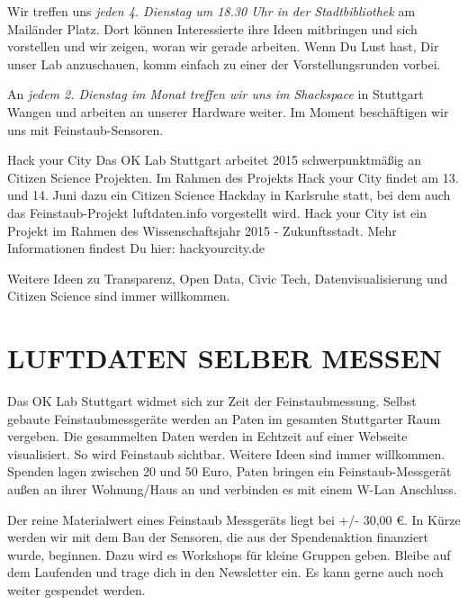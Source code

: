 \documentclass[
notumble,
]{leaflet}
\begin{document}
Wir treffen uns \textit{jeden 4. Dienstag um 18.30 Uhr in der Stadtbibliothek} am Mailänder Platz. Dort können Interessierte ihre Ideen mitbringen und sich vorstellen und wir zeigen, woran wir gerade arbeiten. Wenn Du Lust hast, Dir unser Lab anzuschauen, komm einfach zu einer der Vorstellungsrunden vorbei.

An \textit{jedem 2. Dienstag im Monat treffen wir uns im Shackspace} in Stuttgart Wangen und arbeiten an unserer Hardware weiter. Im Moment beschäftigen wir uns mit Feinstaub-Sensoren.

Hack your City Das OK Lab Stuttgart arbeitet 2015 schwerpunktmäßig an Citizen Science Projekten. Im Rahmen des Projekts Hack your City findet am 13. und 14. Juni dazu ein Citizen Science Hackday in Karlsruhe statt, bei dem auch das Feinstaub-Projekt luftdaten.info vorgestellt wird. Hack your City ist ein Projekt im Rahmen des Wissenschaftsjahr 2015 - Zukunftsstadt. Mehr Informationen findest Du hier: hackyourcity.de

Weitere Ideen zu Transparenz, Open Data, Civic Tech, Datenvisualisierung und Citizen Science sind immer willkommen.




\section{LUFTDATEN SELBER MESSEN}

Das OK Lab Stuttgart widmet sich zur Zeit der Feinstaubmessung. Selbst gebaute Feinstaubmessgeräte werden an Paten im gesamten Stuttgarter Raum vergeben. Die gesammelten Daten werden in Echtzeit auf einer Webseite visualisiert. So wird Feinstaub sichtbar. Weitere Ideen sind immer willkommen.
Spenden lagen zwischen 20 und 50 Euro, Paten bringen ein Feinstaub-Messgerät außen an ihrer Wohnung/Haus an und verbinden es mit einem W-Lan Anschluss.

Der reine Materialwert eines Feinstaub Messgeräts liegt bei +/- 30,00 €. 
% 
In Kürze werden wir mit dem Bau der Sensoren, die aus der Spendenaktion finanziert wurde, beginnen. 
Dazu wird es Workshops für kleine Gruppen geben. Bleibe auf dem Laufenden und trage dich in den Newsletter ein.
Es kann gerne auch noch weiter gespendet werden.
\end{document}
